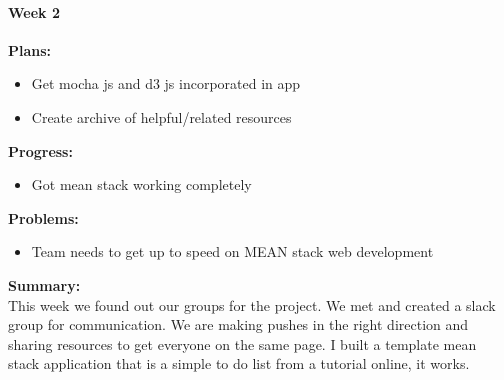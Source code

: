 \paragraph{Week 2}
\begin{adjustwidth}{2.5em}{0pt}
    \vspace{-0.5cm}\textbf{Plans:}
    \vspace{-0.5cm}
    \begin{itemize}
        \item Get mocha js and d3 js incorporated in app
        \item Create archive of helpful/related resources 
    \end{itemize} 
    \vspace{-0.3cm}\textbf{Progress:}
    \vspace{-0.5cm}
    \begin{itemize}
        \item Got mean stack working completely
    \end{itemize} 
    \vspace{-0.3cm}\textbf{Problems:}
    \vspace{-0.5cm}
    \begin{itemize}
        \item Team needs to get up to speed on MEAN stack web development
    \end{itemize}  
    \vspace{-0.3cm}\noindent\textbf{Summary:}\\
    \noindent This week we found out our groups for the project. We met and created a slack group for communication. We are making pushes in the right direction and sharing resources to get everyone on the same page. I built a template mean stack application that is a simple to do list from a tutorial online, it works.
\end{adjustwidth} 
